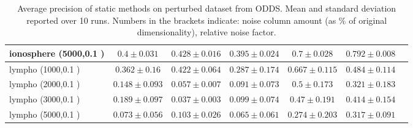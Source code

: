 \documentclass[11pt,onecolumn]{article}
\begin{document}
\begin{footnotesize}
\begin{table}[p!]
\begin{tabular}{lcccccc}
ionosphere (5000,0.1 )& $0.4 \pm 0.031$ &  $0.428 \pm 0.016$ &  $0.395 \pm 0.024$ &  $0.7 \pm 0.028$ &  $0.792 \pm 0.008$    \\
\midrule
lympho (1000,0.1 )& $0.362 \pm 0.16$ &  $0.422 \pm 0.064$ &  $0.287 \pm 0.174$ &  $0.667 \pm 0.115$ &  $0.484 \pm 0.114$    \\
lympho (2000,0.1 )& $0.148 \pm 0.093$ &  $0.057 \pm 0.007$ &  $0.091 \pm 0.073$ &  $0.5 \pm 0.173$ &  $0.321 \pm 0.183$    \\
lympho (3000,0.1 )& $0.189 \pm 0.097$ &  $0.037 \pm 0.003$ &  $0.099 \pm 0.074$ &  $0.47 \pm 0.191$ &  $0.414 \pm 0.154$    \\
lympho (5000,0.1 )& $0.073 \pm 0.056$ &  $0.103 \pm 0.026$ &  $0.065 \pm 0.061$ &  $0.274 \pm 0.203$ &  $0.317 \pm 0.091$    \\
\bottomrule
		\end{tabular}
		\caption{Average precision of static methods on perturbed dataset from ODDS. Mean and standard deviation reported over 10 runs. Numbers in the brackets indicate: noise column amount (as $\%$ of original dimensionality), relative noise factor.}
		\label{table:odds-static-results}
\end{table}
\end{footnotesize}
\end{document}
